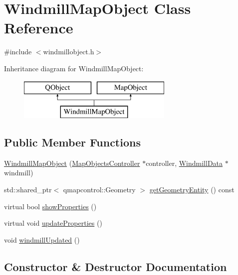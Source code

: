 \hypertarget{class_windmill_map_object}{}\section{Windmill\+Map\+Object Class Reference}
\label{class_windmill_map_object}


{\ttfamily \#include $<$windmillobject.\+h$>$}

Inheritance diagram for Windmill\+Map\+Object\+:\begin{figure}[H]
\begin{center}
\leavevmode
\includegraphics[height=2.000000cm]{d0/d0a/class_windmill_map_object}
\end{center}
\end{figure}
\subsection*{Public Member Functions}
\begin{DoxyCompactItemize}
\item 
\mbox{\hyperlink{class_windmill_map_object_a693849c3b3197c2a0ff0347e34c8b481}{Windmill\+Map\+Object}} (\mbox{\hyperlink{class_map_objects_controller}{Map\+Objects\+Controller}} $\ast$controller, \mbox{\hyperlink{class_windmill_data}{Windmill\+Data}} $\ast$windmill)
\item 
std\+::shared\+\_\+ptr$<$ qmapcontrol\+::\+Geometry $>$ \mbox{\hyperlink{class_windmill_map_object_ac948b3ca6bebec5a1b99375acb557d57}{get\+Geometry\+Entity}} () const
\item 
virtual bool \mbox{\hyperlink{class_windmill_map_object_a692d7518785f4894fae0abf5776bd8c9}{show\+Properties}} ()
\item 
virtual void \mbox{\hyperlink{class_windmill_map_object_ad671bf5c0701e0ad71554f563c95a9e6}{update\+Properties}} ()
\item 
void \mbox{\hyperlink{class_windmill_map_object_ab1947abda21e0d89dc0f47381cf0c324}{windmill\+Updated}} ()
\end{DoxyCompactItemize}


\subsection{Constructor \& Destructor Documentation}
\mbox{\label{class_windmill_map_object_a693849c3b3197c2a0ff0347e34c8b481}} 
